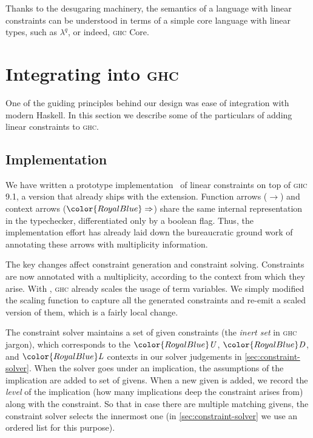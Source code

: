 \documentclass[acmsmall,usenames,dvipsnames,natbib=false,acmthm=false,screen]{acmart}
\newcommand{\constraintcolour}{\color{RoyalBlue}}
\newcommand{\constraintfont}[1]{{\constraintcolour#1}}
\newcommand{\constraintop}[1]{\mathop{\constraintfont{#1}}}
\newcommand{\FatArrow}{\constraintop{\Rightarrow}}
\theoremstyle{acmplain}
\theoremstyle{acmdefinition}
\begin{document}
Thanks to the desugaring machinery, the semantics of a language with linear
constraints can be understood in terms of a simple core language with linear
types, such as $λ^q$, or indeed, \textsc{ghc} Core.

\section{Integrating into \textsc{ghc}}

One of the guiding principles behind our design was ease of integration with
modern Haskell. In this section we describe some of the particulars of adding
linear constraints to \textsc{ghc}.

\subsection{Implementation}
\label{sec:implementation}

We have written a prototype implementation~\cite{prototype} of linear constraints on top of \textsc{ghc} 9.1, a version that already
ships with the  extension. Function arrows (\ensuremath{\to }) and context arrows
(\ensuremath{\FatArrow }) share the same internal representation in the typechecker, differentiated
only by a boolean flag. Thus, the  implementation effort has already
laid down the bureaucratic ground work of annotating these arrows with
multiplicity information.

The key changes affect constraint generation and constraint solving. Constraints
are now annotated with a multiplicity, according to the context from
which they arise. With , \textsc{ghc} already scales the usage
of term variables. We simply modified the scaling function to capture all the
generated constraints and re-emit a scaled version of them, which is a fairly local
change.

The constraint solver maintains a set of given constraints (the \emph{inert set}
in \textsc{ghc} jargon), which corresponds to the $  \constraintfont{ \ottnt{U} }  $, $  \constraintfont{ \ottnt{D} }  $, and $  \constraintfont{ \ottnt{L} }  $
contexts in our solver judgements in \cref{sec:constraint-solver}. When
the solver goes under an implication, the assumptions of the implication are
added to set of givens. When a new given is added, we record the \emph{level} of
the implication (how many implications deep the constraint arises from) along
with the constraint. So that in case there are multiple matching
givens, the constraint solver selects the innermost one
(in \cref{sec:constraint-solver} we use an ordered list
for this purpose).
\end{document}
